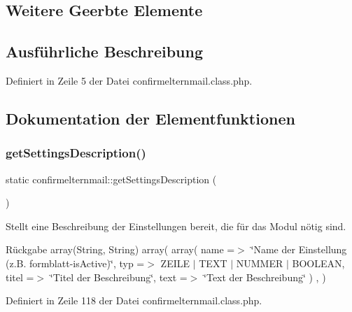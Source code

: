 \subsection*{Weitere Geerbte Elemente}


\subsection{Ausführliche Beschreibung}


Definiert in Zeile 5 der Datei confirmelternmail.\+class.\+php.



\subsection{Dokumentation der Elementfunktionen}
\mbox{\label{classconfirmelternmail_a808cb37c809df7163829d5b0bfd9db4c}} 
\subsubsection{\texorpdfstring{get\+Settings\+Description()}{getSettingsDescription()}}
{\footnotesize\ttfamily static confirmelternmail\+::get\+Settings\+Description (\begin{DoxyParamCaption}{ }\end{DoxyParamCaption})\hspace{0.3cm}{\ttfamily [static]}}

Stellt eine Beschreibung der Einstellungen bereit, die für das Modul nötig sind. \begin{DoxyReturn}{Rückgabe}
array(\+String, String) array( array( \textquotesingle{}name\textquotesingle{} =$>$ \char`\"{}\+Name der Einstellung (z.\+B. formblatt-\/is\+Active)\char`\"{}, \textquotesingle{}typ\textquotesingle{} =$>$ Z\+E\+I\+LE $\vert$ T\+E\+XT $\vert$ N\+U\+M\+M\+ER $\vert$ B\+O\+O\+L\+E\+AN, \textquotesingle{}titel\textquotesingle{} =$>$ \char`\"{}\+Titel der Beschreibung\char`\"{}, \textquotesingle{}text\textquotesingle{} =$>$ \char`\"{}\+Text der Beschreibung\char`\"{} ) , ) 
\end{DoxyReturn}


Definiert in Zeile 118 der Datei confirmelternmail.\+class.\+php.

\mbox{\label{classconfirmelternmail_a33f2ef17af78b5cce1fea00bfac328ba}} 
